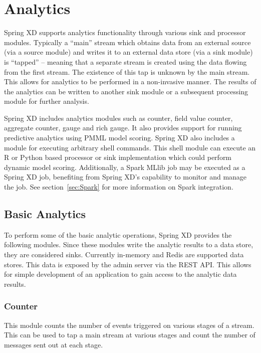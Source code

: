 \section{Analytics}
\label{sec:Analytics}

Spring XD supports analytics functionality through various sink and processor modules.
Typically a ``main'' stream which obtains data from an external source (via
a source module) and writes it to an external data store (via a sink module)
is ``tapped'' -- meaning that a separate stream is created using the data
flowing from the first stream. The existence of this tap is unknown by the
main stream. This allows for analytics to be performed in a non-invasive manner.
The results of the analytics can be written to another sink module or a
subsequent processing module for further analysis.

\par

Spring XD includes analytics modules such as counter, field value counter,
aggregate counter, gauge and rich gauge. It also provides support for running
predictive analytics using PMML\cite{pmml} model scoring. Spring XD also includes a module
for executing arbitrary shell commands. This shell module can execute an R\cite{r-language}
or Python\cite{python-language} based processor or sink implementation which could perform
dynamic model scoring. Additionally, a Spark MLlib job may be executed as a Spring XD job,
benefiting from Spring XD's capability to monitor and manage the job. See section~\ref{sec:Spark}
for more information on Spark integration.

\subsection {Basic Analytics}

To perform some of the basic analytic operations, Spring XD provides the following
modules. Since these modules write the analytic results to a data store, they are
considered sinks. Currently in-memory and Redis\cite{redis} are supported data stores. This
data is exposed by the admin server via the REST API. This allows for simple
development of an application to gain access to the analytic data results.

\subsubsection {Counter}

This module counts the number of events triggered on various stages of a stream.
This can be used to tap a main stream at various stages and count the number
of messages sent out at each stage.

